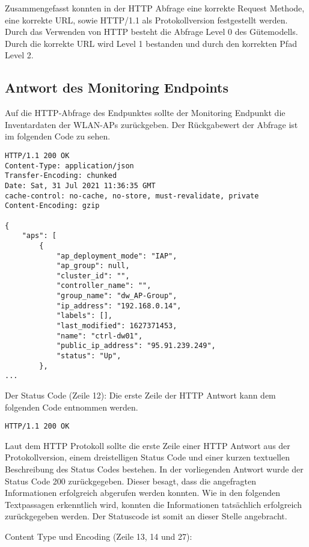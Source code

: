 Zusammengefasst konnten in der HTTP Abfrage eine korrekte Request Methode, eine korrekte URL, sowie HTTP/1.1 als Protokollversion festgestellt werden. Durch das Verwenden von HTTP besteht die Abfrage Level 0 des Gütemodells. Durch die korrekte URL wird Level 1 bestanden und durch den korrekten Pfad Level 2.

\subsection{Antwort des Monitoring Endpoints}\label{subsection:antwort-des-monitoring-endpunktes}

Auf die HTTP-Abfrage des Endpunktes sollte der Monitoring Endpunkt die Inventardaten der WLAN-APs zurückgeben. Der Rückgabewert der Abfrage ist im folgenden Code zu sehen.


\lstset{firstnumber=12}
\begin{lstlisting}
HTTP/1.1 200 OK
Content-Type: application/json
Transfer-Encoding: chunked
Date: Sat, 31 Jul 2021 11:36:35 GMT
cache-control: no-cache, no-store, must-revalidate, private
Content-Encoding: gzip
 
{
	"aps": [
		{
			"ap_deployment_mode": "IAP",
			"ap_group": null,
			"cluster_id": "",
			"controller_name": "",
			"group_name": "dw_AP-Group",
			"ip_address": "192.168.0.14",
			"labels": [],
			"last_modified": 1627371453,
			"name": "ctrl-dw01",
			"public_ip_address": "95.91.239.249",
			"status": "Up",
		},
...    
\end{lstlisting}

Der Status Code (Zeile 12):
Die erste Zeile der HTTP Antwort kann dem folgenden Code entnommen werden.

\lstset{firstnumber=12}
\begin{lstlisting}
HTTP/1.1 200 OK
\end{lstlisting}

Laut dem HTTP Protokoll sollte die erste Zeile einer HTTP Antwort aus der Protokollversion, einem dreistelligen Status Code und einer kurzen textuellen Beschreibung des Status Codes bestehen. In der vorliegenden Antwort wurde der Status Code 200 zurückgegeben. Dieser besagt, dass die angefragten Informationen erfolgreich abgerufen werden konnten. Wie in den folgenden Textpassagen erkenntlich wird, konnten die Informationen tatsächlich erfolgreich zurückgegeben werden. Der Statuscode ist somit an dieser Stelle angebracht.

Content Type und Encoding (Zeile 13, 14 und 27): 

